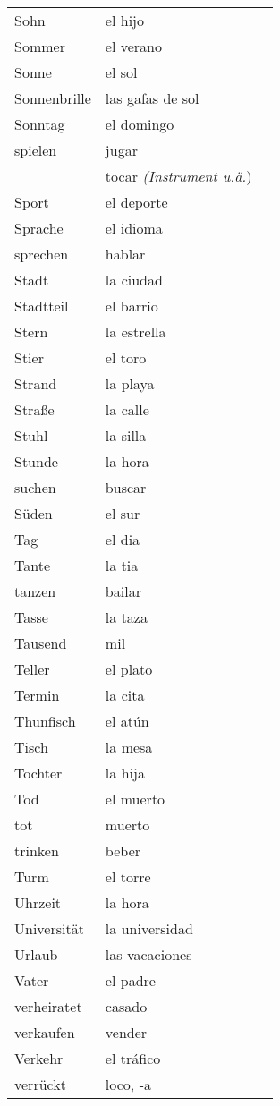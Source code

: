 \documentclass[10pt,spanish]{article}
\begin{document}
\begin{longtable}{p{} p{} | p{}}
Sohn & el hijo  \\
Sommer & el verano  \\
Sonne & el sol  \\
Sonnenbrille & las gafas de sol \\
Sonntag & el domingo  \\
spielen & jugar  \\
& tocar \textit{(Instrument u.ä.}) \\
Sport & el deporte  \\
Sprache & el idioma  \\
sprechen & hablar  \\
Stadt & la ciudad \\
Stadtteil & el barrio  \\
Stern & la estrella \\
Stier & el toro  \\
Strand & la playa  \\
Straße & la calle  \\
Stuhl & la silla  \\
Stunde & la hora  \\
suchen & buscar  \\
Süden & el sur  \\
Tag & el dia  \\
Tante & la tia  \\
tanzen & bailar  \\
Tasse & la taza  \\
Tausend & mil  \\
Teller & el plato  \\
Termin & la cita  \\
Thunfisch & el atún \\
Tisch & la mesa  \\
Tochter & la hija  \\
Tod & el muerto \\
tot & muerto \\
trinken & beber  \\
Turm & el torre  \\
Uhrzeit & la hora  \\
Universität & la universidad \\
Urlaub & las vacaciones  \\
Vater & el padre  \\
verheiratet & casado  \\
verkaufen & vender  \\
Verkehr & el tráfico \\
verrückt & loco, -a  \\

\end{longtable}
\end{document}
